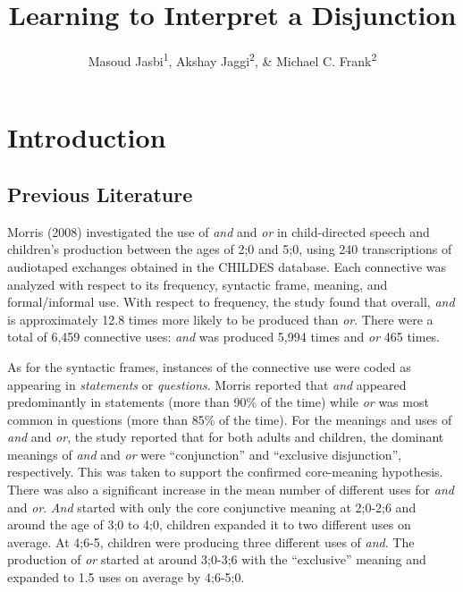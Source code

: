 \documentclass[floatsintext,man]{apa6}
\title{Learning to Interpret a Disjunction}
\author{Masoud Jasbi\textsuperscript{1}, Akshay Jaggi\textsuperscript{2}, \& Michael C. Frank\textsuperscript{2}}
\affiliation{
    \vspace{0.5cm}
          \textsuperscript{1} Harvard University\\
          \textsuperscript{2} Stanford University  }
\theoremstyle{definition}
\theoremstyle{definition}
\theoremstyle{definition}
\theoremstyle{remark}
\begin{document}
\maketitle

\setcounter{secnumdepth}{0}



\section{Introduction}\label{introduction}

\subsection{Previous Literature}\label{previous-literature}

Morris (2008) investigated the use of \emph{and} and \emph{or} in
child-directed speech and children's production between the ages of 2;0
and 5;0, using 240 transcriptions of audiotaped exchanges obtained in
the CHILDES database. Each connective was analyzed with respect to its
frequency, syntactic frame, meaning, and formal/informal use. With
respect to frequency, the study found that overall, \emph{and} is
approximately 12.8 times more likely to be produced than \emph{or}.
There were a total of 6,459 connective uses: \emph{and} was produced
5,994 times and \emph{or} 465 times.

As for the syntactic frames, instances of the connective use were coded
as appearing in \emph{statements} or \emph{questions}. Morris reported
that \emph{and} appeared predominantly in statements (more than 90\% of
the time) while \emph{or} was most common in questions (more than 85\%
of the time). For the meanings and uses of \emph{and} and \emph{or}, the
study reported that for both adults and children, the dominant meanings
of \emph{and} and \emph{or} were \enquote{conjunction} and
\enquote{exclusive disjunction}, respectively. This was taken to support
the confirmed core-meaning hypothesis. There was also a significant
increase in the mean number of different uses for \emph{and} and
\emph{or}. \emph{And} started with only the core conjunctive meaning at
2;0-2;6 and around the age of 3;0 to 4;0, children expanded it to two
different uses on average. At 4;6-5, children were producing three
different uses of \emph{and}. The production of \emph{or} started at
around 3;0-3;6 with the \enquote{exclusive} meaning and expanded to 1.5
uses on average by 4;6-5;0.
\end{document}
